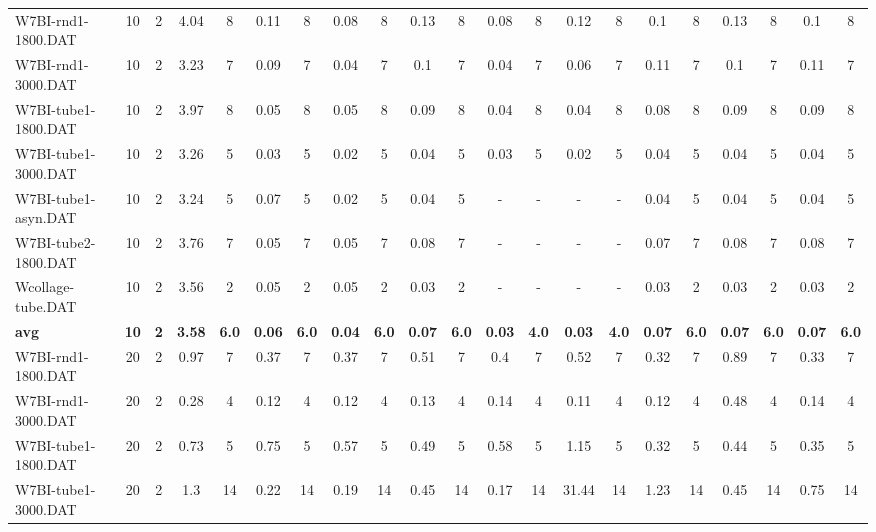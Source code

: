 \begin{sidewaystable}[!ht]
{\begin{tabular}{lcccccccccccccccccccc}
W7BI-rnd1-1800.DAT & 10 & 2 & 4.04 & 8 & 0.11 & 8 &  \textcolor{blue2}{0.08} & 8 & 0.13 & 8 &  \textcolor{blue2}{0.08} & 8 & 0.12 & 8 & 0.1 & 8 & 0.13 & 8 & 0.1 & 8 \\
W7BI-rnd1-3000.DAT & 10 & 2 & 3.23 & 7 & 0.09 & 7 &  \textcolor{blue2}{0.04} & 7 & 0.1 & 7 &  \textcolor{blue2}{0.04} & 7 & 0.06 & 7 & 0.11 & 7 & 0.1 & 7 & 0.11 & 7 \\
W7BI-tube1-1800.DAT & 10 & 2 & 3.97 & 8 & 0.05 & 8 & 0.05 & 8 & 0.09 & 8 &  \textcolor{blue2}{0.04} & 8 &  \textcolor{blue2}{0.04} & 8 & 0.08 & 8 & 0.09 & 8 & 0.09 & 8 \\
W7BI-tube1-3000.DAT & 10 & 2 & 3.26 & 5 & 0.03 & 5 &  \textcolor{blue2}{0.02} & 5 & 0.04 & 5 & 0.03 & 5 &  \textcolor{blue2}{0.02} & 5 & 0.04 & 5 & 0.04 & 5 & 0.04 & 5 \\
W7BI-tube1-asyn.DAT & 10 & 2 & 3.24 & 5 & 0.07 & 5 &  \textcolor{blue2}{0.02} & 5 & 0.04 & 5 &  - &  - &  - &  - & 0.04 & 5 & 0.04 & 5 & 0.04 & 5 \\
W7BI-tube2-1800.DAT & 10 & 2 & 3.76 & 7 &  \textcolor{blue2}{0.05} & 7 &  \textcolor{blue2}{0.05} & 7 & 0.08 & 7 &  - &  - &  - &  - & 0.07 & 7 & 0.08 & 7 & 0.08 & 7 \\
Wcollage-tube.DAT & 10 & 2 & 3.56 & 2 & 0.05 & 2 & 0.05 & 2 &  \textcolor{blue2}{0.03} & 2 &  - &  - &  - &  - &  \textcolor{blue2}{0.03} & 2 &  \textcolor{blue2}{0.03} & 2 &  \textcolor{blue2}{0.03} & 2 \\
\cline{1-21} \textbf{avg} & \textbf{10} & \textbf{2} & \textbf{3.58} & \textbf{6.0} & \textbf{0.06} & \textbf{6.0} & \textbf{0.04} & \textbf{6.0} & \textbf{0.07} & \textbf{6.0} & \textbf{0.03} & \textbf{4.0} & \textbf{0.03} & \textbf{4.0} & \textbf{0.07} & \textbf{6.0} & \textbf{0.07} & \textbf{6.0} & \textbf{0.07} & \textbf{6.0} \\ \cline{1-21}
W7BI-rnd1-1800.DAT & 20 & 2 & 0.97 & 7 & 0.37 & 7 & 0.37 & 7 & 0.51 & 7 & 0.4 & 7 & 0.52 & 7 &  \textcolor{blue2}{0.32} & 7 & 0.89 & 7 & 0.33 & 7 \\
W7BI-rnd1-3000.DAT & 20 & 2 & 0.28 & 4 & 0.12 & 4 & 0.12 & 4 & 0.13 & 4 & 0.14 & 4 &  \textcolor{blue2}{0.11} & 4 & 0.12 & 4 & 0.48 & 4 & 0.14 & 4 \\
W7BI-tube1-1800.DAT & 20 & 2 & 0.73 & 5 & 0.75 & 5 & 0.57 & 5 & 0.49 & 5 & 0.58 & 5 & 1.15 & 5 &  \textcolor{blue2}{0.32} & 5 & 0.44 & 5 & 0.35 & 5 \\
W7BI-tube1-3000.DAT & 20 & 2 & 1.3 & 14 & 0.22 & 14 & 0.19 & 14 & 0.45 & 14 &  \textcolor{blue2}{0.17} & 14 & 31.44 & 14 & 1.23 & 14 & 0.45 & 14 & 0.75 & 14 \\

\end{tabular}}
\end{sidewaystable}
